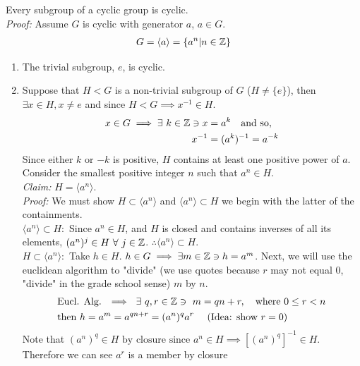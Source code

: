 \begin{proposition}
Every subgroup of a cyclic group is cyclic.\\
\textit{Proof:} Assume $G$ is cyclic with generator $a$, $a\in G$.
\begin{align}
    G=\langle a\rangle= \{a^n|n\in {\mathbb{ Z}}\} \nonumber
\end{align}
\begin{enumerate}
    \item The trivial subgroup, $e$, is cyclic.
    \item Suppose that $H<G$ is a non-trivial subgroup of $G$  ($H\neq \{e\}$), then $\exists x\in H, x\neq e$ and since $H<G \implies x^{-1}\in H$.
    \begin{align}
        x\in G \implies \exists \ k \in {\mathbb{ Z}} \ni x&=a^k \ \ \text{ and so,} \nonumber \\
        x^{-1}&=(a^k)^{-1}=a^{-k} \nonumber
    \end{align}
    Since either $k$ or $-k$ is positive, $H$ contains at least one positive power of $a$.\\
    Consider the smallest positive integer $n$ such that $a^n\in H$.\\
    \textit{Claim:} $H=\langle a^n \rangle $.\\
    \textit{Proof:} We must show $H\subset \langle a^n \rangle$ and $ \langle a^n \rangle \subset H$ we begin with the latter of the containments.\\
    $\langle a^n \rangle \subset H:$ Since $a^n\in H$, and $H$ is closed and contains inverses of all its elements, $(a^n)^j\in H \ \forall \ j\in {\mathbb{ Z}}$. $\therefore \langle a^n \rangle \subset H$.\steezybreak\\
    $ H\subset\langle a^n \rangle :$ Take $h\in H$. $h\in G \implies \exists m\in{\mathbb{ Z}} \ni h=a^m$. Next, we will use the euclidean algorithm to "divide" (we use quotes because $r$ may not equal $0$, "divide" in the grade school sense) $m$ by $n$.
    \begin{align}
        &\text{Eucl. Alg. } \implies \ \exists \ q,r\in \Z \ni \ m=qn+r, \ \ \text{ where } 0\leq r < n \nonumber \\
        &\text{then  }h=a^m=a^{qn+r}=(a^n)^q a^r \ \ \ \ (\text{Idea: show }r=0)\nonumber
    \end{align}
    Note that $(a^n)^q \in H \text{ by closure since } a^n \in H \implies [(a^n)^q]^{-1}\in H$. Therefore we can see $a^r$ is a member by closure
    \begin{align}

\end{align}
\end{enumerate}
\end{proposition}
